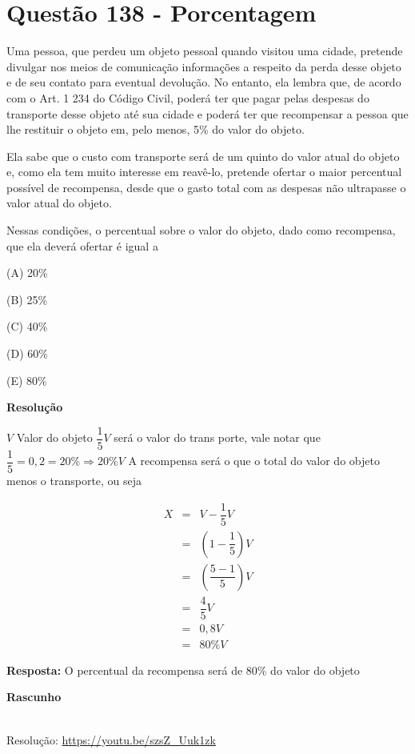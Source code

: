 \section{Questão 138 - Porcentagem}

Uma pessoa, que perdeu um objeto pessoal quando visitou uma cidade, pretende divulgar nos meios de comunicação informações a respeito da perda desse objeto e de seu contato para eventual devolução. 
No entanto, ela lembra que, de acordo com o Art. 1 234 do Código Civil, poderá ter que pagar pelas despesas do transporte desse objeto até sua cidade e poderá ter que recompensar a pessoa que lhe restituir o objeto em, pelo menos, 5\% do valor do objeto. 

Ela sabe que o custo com transporte será de um quinto do valor atual do objeto e, como ela tem muito interesse em reavê-lo, pretende ofertar o maior percentual possível de recompensa, desde que o gasto total com as despesas não ultrapasse o valor atual do objeto.

Nessas condições, o percentual sobre o valor do objeto, dado como recompensa, que ela deverá ofertar é igual a

(A) 20\%

(B) 25\%

(C) 40\%

(D) 60\%

(E) 80\%

\textbf{Resolução}

$ V $ Valor do objeto
$ \dfrac{1}{5}V $ será o valor do trans porte, vale notar que $ \dfrac{1}{5} = 0,2 = 20\% \Rightarrow 20\%V $
A recompensa será o que o total do valor do objeto menos o transporte, ou seja


\begin{eqnarray*}
    X &=& V - \dfrac{1}{5}V \\
      &=& \left(1 - \dfrac{1}{5}\right)V \\
      &=& \left(\dfrac{5 - 1}{5}\right)V \\
      &=& \dfrac{4}{5}V \\
      &=& 0,8V \\
      &=& 80\%V 
\end{eqnarray*}

\textbf{Resposta:} O percentual da recompensa será de 80\% do valor do objeto

\textbf{Rascunho}

\quad
{}\quad


\begin{center}
    \href{https://youtu.be/S22SHYt4n-o}{
    }\\
    Resolução: \url{https://youtu.be/szsZ_Uuk1zk}
\end{center}
